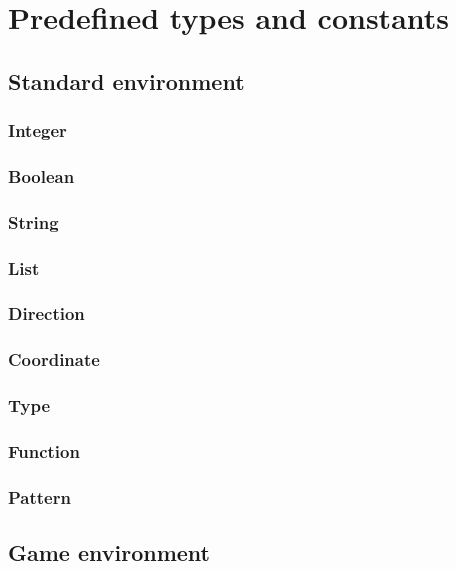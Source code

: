 \section{Predefined types and constants}
\label{sec:predefined}


\subsection{Standard environment}


\subsubsection{Integer}

\subsubsection{Boolean}

\subsubsection{String}

\subsubsection{List}

\subsubsection{Direction}

\subsubsection{Coordinate}

\subsubsection{Type}

\subsubsection{Function}

\subsubsection{Pattern}

\subsection{Game environment}

